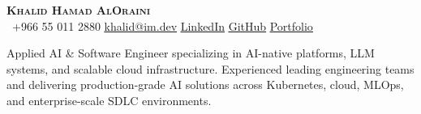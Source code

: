 \begin{center}
    \textbf{\Huge \scshape Khalid Hamad AlOraini} \\ \vspace{1pt}
     \ \small +966 55 011 2880 \quad
    \href{mailto:khalid@im.dev}{ \underline{khalid@im.dev}} \quad
    \href{https://www.linkedin.com/in/khalid-hamad}{ \underline{LinkedIn}} \quad
    \href{https://github.com/Khalid-Hamad}{ \underline{GitHub}} \quad
    \href{https://eportfolio.mygreatlearning.com/khalid-hamad-al-subaie}{ \underline{Portfolio}}
\end{center}
\vspace{-8pt}
\small{Applied AI \& Software Engineer specializing in AI-native platforms, LLM systems, and scalable cloud infrastructure. Experienced leading engineering teams and delivering production-grade AI solutions across Kubernetes, cloud, MLOps, and enterprise-scale SDLC environments.}
